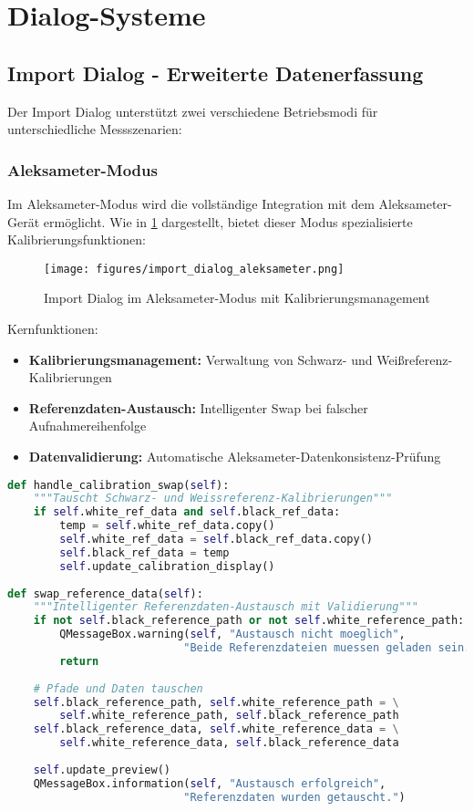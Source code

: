 \section{Dialog-Systeme}

\subsection{Import Dialog - Erweiterte Datenerfassung}

Der Import Dialog unterstützt zwei verschiedene Betriebsmodi für unterschiedliche Messszenarien:

\subsubsection{Aleksameter-Modus}
Im Aleksameter-Modus wird die vollständige Integration mit dem Aleksameter-Gerät ermöglicht. Wie in \ref{fig:import_aleksameter} dargestellt, bietet dieser Modus spezialisierte Kalibrierungsfunktionen:

\begin{figure}[H]
    \centering
\texttt{[image: figures/import\_dialog\_aleksameter.png]}
\caption{Import Dialog im Aleksameter-Modus mit Kalibrierungsmanagement}
\label{fig:import_aleksameter}
\end{figure}

Kernfunktionen:
\begin{itemize}
    \item \textbf{Kalibrierungsmanagement:} Verwaltung von Schwarz- und Weißreferenz-Kalibrierungen
    \item \textbf{Referenzdaten-Austausch:} Intelligenter Swap bei falscher Aufnahmereihenfolge
    \item \textbf{Datenvalidierung:} Automatische Aleksameter-Datenkonsistenz-Prüfung
\end{itemize}

\begin{lstlisting}[language=Python, caption=Aleksameter Kalibrierungssteuerung]
def handle_calibration_swap(self):
    """Tauscht Schwarz- und Weissreferenz-Kalibrierungen"""
    if self.white_ref_data and self.black_ref_data:
        temp = self.white_ref_data.copy()
        self.white_ref_data = self.black_ref_data.copy()
        self.black_ref_data = temp
        self.update_calibration_display()
        
def swap_reference_data(self):
    """Intelligenter Referenzdaten-Austausch mit Validierung"""
    if not self.black_reference_path or not self.white_reference_path:
        QMessageBox.warning(self, "Austausch nicht moeglich", 
                           "Beide Referenzdateien muessen geladen sein.")
        return
    
    # Pfade und Daten tauschen
    self.black_reference_path, self.white_reference_path = \
        self.white_reference_path, self.black_reference_path
    self.black_reference_data, self.white_reference_data = \
        self.white_reference_data, self.black_reference_data
    
    self.update_preview()
    QMessageBox.information(self, "Austausch erfolgreich", 
                           "Referenzdaten wurden getauscht.")
\end{lstlisting}

